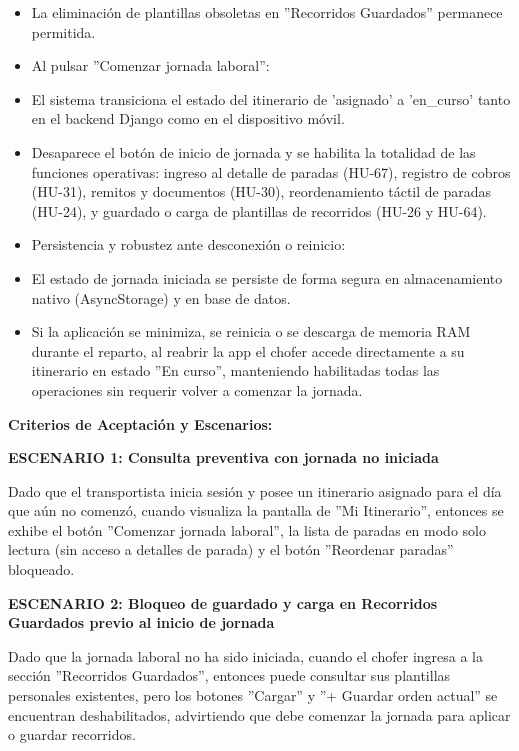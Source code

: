 \documentclass[a4paper,9pt]{article}
\begin{document}
\begin{tcolorbox}
{\begin{itemize}[leftmargin=12pt, nosep, itemsep=1.5pt, topsep=1pt]
\item La eliminación de plantillas obsoletas en ''Recorridos Guardados'' permanece permitida.
\item Al pulsar ''Comenzar jornada laboral'':
\item El sistema transiciona el estado del itinerario de 'asignado' a 'en\_curso' tanto en el backend Django como en el dispositivo móvil.
\item Desaparece el botón de inicio de jornada y se habilita la totalidad de las funciones operativas: ingreso al detalle de paradas (HU-67), registro de cobros (HU-31), remitos y documentos (HU-30), reordenamiento táctil de paradas (HU-24), y guardado o carga de plantillas de recorridos (HU-26 y HU-64).
\item Persistencia y robustez ante desconexión o reinicio:
\item El estado de jornada iniciada se persiste de forma segura en almacenamiento nativo (AsyncStorage) y en base de datos.
\item Si la aplicación se minimiza, se reinicia o se descarga de memoria RAM durante el reparto, al reabrir la app el chofer accede directamente a su itinerario en estado ''En curso'', manteniendo habilitadas todas las operaciones sin requerir volver a comenzar la jornada.
\end{itemize}
}\par\vspace{3pt}
\noindent\textbf{\footnotesize Criterios de Aceptación y Escenarios:}\par\vspace{2pt}
{\footnotesize
\noindent\textbf{\textcolor{secondarydark}{ESCENARIO 1:  Consulta preventiva con jornada no iniciada}}\par\vspace{1pt}
Dado que el transportista inicia sesión y posee un itinerario asignado para el día que aún no comenzó, cuando visualiza la pantalla de ''Mi Itinerario'', entonces se exhibe el botón ''Comenzar jornada laboral'', la lista de paradas en modo solo lectura (sin acceso a detalles de parada) y el botón ''Reordenar paradas'' bloqueado.\par\vspace{2.5pt}
\noindent\textbf{\textcolor{secondarydark}{ESCENARIO 2:  Bloqueo de guardado y carga en Recorridos Guardados previo al inicio de jornada}}\par\vspace{1pt}
Dado que la jornada laboral no ha sido iniciada, cuando el chofer ingresa a la sección ''Recorridos Guardados'', entonces puede consultar sus plantillas personales existentes, pero los botones ''Cargar'' y ''+ Guardar orden actual'' se encuentran deshabilitados, advirtiendo que debe comenzar la jornada para aplicar o guardar recorridos.\par\vspace{2.5pt}
}
\end{tcolorbox}
\end{document}
